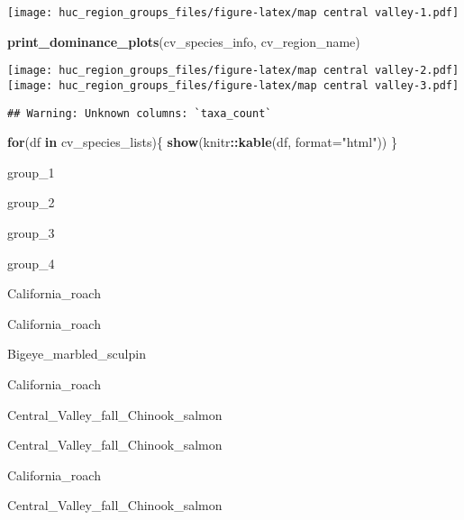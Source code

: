 \documentclass[]{article}
\newenvironment{Shaded}{\begin{snugshade}}{\end{snugshade}}
\newcommand{\KeywordTok}[1]{\textcolor[rgb]{0.13,0.29,0.53}{\textbf{#1}}}
\newcommand{\DataTypeTok}[1]{\textcolor[rgb]{0.13,0.29,0.53}{#1}}
\newcommand{\StringTok}[1]{\textcolor[rgb]{0.31,0.60,0.02}{#1}}
\newcommand{\CommentTok}[1]{\textcolor[rgb]{0.56,0.35,0.01}{\textit{#1}}}
\newcommand{\ControlFlowTok}[1]{\textcolor[rgb]{0.13,0.29,0.53}{\textbf{#1}}}
\newcommand{\OperatorTok}[1]{\textcolor[rgb]{0.81,0.36,0.00}{\textbf{#1}}}
\newcommand{\NormalTok}[1]{#1}
\begin{document}
\texttt{[image: huc\_region\_groups\_files/figure-latex/map central valley-1.pdf]}

\begin{Shaded}
\begin{Highlighting}[]
\KeywordTok{print_dominance_plots}\NormalTok{(cv_species_info, cv_region_name)}
\end{Highlighting}
\end{Shaded}

\texttt{[image: huc\_region\_groups\_files/figure-latex/map central valley-2.pdf]}
\texttt{[image: huc\_region\_groups\_files/figure-latex/map central valley-3.pdf]}

\begin{Shaded}
\end{Shaded}

\begin{verbatim}
## Warning: Unknown columns: `taxa_count`
\end{verbatim}

\begin{Shaded}
\begin{Highlighting}[]
\ControlFlowTok{for}\NormalTok{(df }\ControlFlowTok{in}\NormalTok{ cv_species_lists)\{}
  \KeywordTok{show}\NormalTok{(knitr}\OperatorTok{::}\KeywordTok{kable}\NormalTok{(df, }\DataTypeTok{format=}\StringTok{"html"}\NormalTok{))}
\NormalTok{\}}
\end{Highlighting}
\end{Shaded}

group\_1

group\_2

group\_3

group\_4

California\_roach

California\_roach

Bigeye\_marbled\_sculpin

California\_roach

Central\_Valley\_fall\_Chinook\_salmon

Central\_Valley\_fall\_Chinook\_salmon

California\_roach

Central\_Valley\_fall\_Chinook\_salmon
\end{document}
